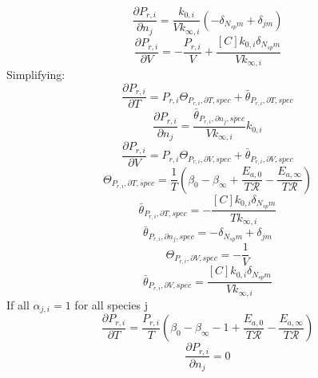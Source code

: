 \documentclass[a4paper,10pt]{article}
\newcommand{\ns}{N_{sp}}
\newcommand{\Ru}{\mathcal{R}}
\begin{document}
\begin{dmath} \frac{\partial P_{r, i} }{\partial {n_j} } = \frac{k_{0, i}}{V k_{\infty, i}} \left(- \delta_{\ns m} + \delta_{j m}\right)\end{dmath} 
\begin{dmath} \frac{\partial P_{r, i} }{\partial V } = - \frac{P_{r, i}}{V} + \frac{[C] k_{0, i} \delta_{\ns m}}{V k_{\infty, i}}\end{dmath} 
Simplifying:
\begin{dmath} \frac{\partial P_{r, i} }{\partial T } = P_{r, i} \Theta_{P_{r,i}, \partial T, spec} + \bar{\theta}_{P_{r, i}, \partial T, spec}\end{dmath} 
\begin{dmath} \frac{\partial P_{r, i} }{\partial {n_j} } = \frac{\bar{\theta}_{P_{r, i}, \partial n_j, spec}}{V k_{\infty, i}} k_{0, i}\end{dmath} 
\begin{dmath} \frac{\partial P_{r, i} }{\partial V } = P_{r, i} \Theta_{P_{r,i}, \partial V, spec} + \bar{\theta}_{P_{r, i}, \partial V, spec}\end{dmath} 
\begin{dmath} \Theta_{P_{r,i}, \partial T, spec} = \frac{1}{T} \left(\beta_{0} - \beta_{\infty} + \frac{E_{a, 0}}{T \Ru} - \frac{E_{a, \infty}}{T \Ru}\right)\end{dmath} 
\begin{dmath} \bar{\theta}_{P_{r, i}, \partial T, spec} = - \frac{[C] k_{0, i} \delta_{\ns m}}{T k_{\infty, i}}\end{dmath} 
\begin{dmath} \bar{\theta}_{P_{r, i}, \partial n_j, spec} = - \delta_{\ns m} + \delta_{j m}\end{dmath} 
\begin{dmath} \Theta_{P_{r,i}, \partial V, spec} = - \frac{1}{V}\end{dmath} 
\begin{dmath} \bar{\theta}_{P_{r, i}, \partial V, spec} = \frac{[C] k_{0, i} \delta_{\ns m}}{V k_{\infty, i}}\end{dmath} 
If all $\alpha_{j, i} = 1$ for all species j
\begin{dmath} \frac{\partial P_{r, i} }{\partial T } = \frac{P_{r, i}}{T} \left(\beta_{0} - \beta_{\infty} - 1 + \frac{E_{a, 0}}{T \Ru} - \frac{E_{a, \infty}}{T \Ru}\right)\end{dmath} 
\begin{dmath} \frac{\partial P_{r, i} }{\partial {n_j} } = 0\end{dmath} 
\end{document}
